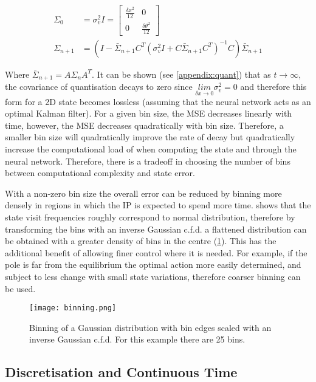\documentclass[../main.tex]{subfiles}
\begin{document}
\begin{align}
   \Sigma_0 &= \sigma_v^2 I = \begin{bmatrix} \frac{\delta x^2}{12} & 0 \\ 0 & \frac{\delta \theta^2}{12} \end{bmatrix}\label{equ:errora}\\
      \Sigma_{n+1} &= (I - \bar{\Sigma}_{n+1}C^T (\sigma_v^2 I + C \bar{\Sigma}_{n+1} C^T)^{-1} C)\bar{\Sigma}_{n+1} \label{equ:errorb}
\end{align}

Where $\bar{\Sigma}_{n+1} = A \Sigma_n A^T$. It can be shown (see \cref{appendix:quant}) that as $t \rightarrow \infty$, the covariance of quantisation decays to zero since $\underset{\delta x \rightarrow 0}{lim} \sigma_v^2 = 0$ and therefore this form for a 2D state becomes lossless (assuming that the neural network acts as an optimal Kalman filter). For a given bin size, the MSE decreases linearly with time, however, the MSE decreases quadratically with bin size. Therefore, a smaller bin size will quadratically improve the rate of decay but quadratically increase the computational load of when computing the state and through the neural network. Therefore, there is a tradeoff in choosing the number of bins between computational complexity and state error. 

With a non-zero bin size the overall error can be reduced by binning more densely in regions in which the IP is expected to spend more time.  shows that the state visit frequencies roughly correspond to normal distribution, therefore by transforming the bins with an inverse Gaussian c.f.d. a flattened distribution can be obtained with a greater density of bins in the centre (\cref{fig:binning}). This has the additional benefit of allowing finer control where it is needed. For example, if the pole is far from the equilibrium the optimal action more easily determined, and subject to less change with small state variations, therefore coarser binning can be used.

\begin{figure}[h]
   \centering
   \texttt{[image: binning.png]}
   \caption{Binning of a Gaussian distribution with bin edges scaled with an inverse Gaussian c.f.d. For this example there are 25 bins.}
   \label{fig:binning}
\end{figure}

\subsection{Discretisation and Continuous Time}
\end{document}
